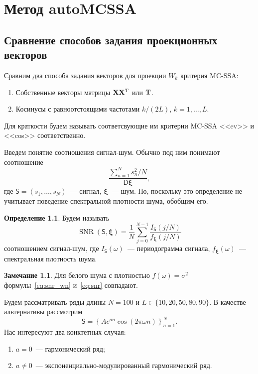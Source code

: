 \documentclass[specialist,
substylefile = spbu_report.rtx,
subf,href,colorlinks=true, 12pt]{disser}
\theoremstyle{definition}
\newtheorem{definition}{Определение}[chapter]
\newtheorem{remark}{Замечание}[chapter]
\begin{document}
\chapter{Метод autoMCSSA}

\section{Сравнение способов задания проекционных векторов}

Сравним два способа задания векторов для проекции $W_k$ критерия MC-SSA:
\begin{enumerate}
	\item Собственные векторы матрицы $\mathbf{X}\mathbf{X}^{\mathrm{T}}$ или $\mathbf{T}$.
	\item Косинусы с равноотстоящими частотами $k/(2L)$, $k=1,\ldots,L$.
\end{enumerate}
Для краткости будем называть соответсвующие им критерии MC-SSA <<ev>> и <<cos>> соответственно.

Введем понятие соотношения сигнал-шум. Обычно под ним понимают соотношение
\begin{equation}
\frac{\sum\limits_{n=1}^N s^2_n/N}{\mathsf{D}{\boldsymbol\xi}},
\end{equation}\label{eq:snr_wn}
где $\mathsf{S}=(s_1,\ldots,s_N)$~--- сигнал, $\boldsymbol{\xi}$~--- шум. Но, поскольку это определение не учитывает поведение спектральной плотности шума, обобщим его. 

\begin{definition}
Будем называть
\begin{equation}\label{eq:snr}
	\operatorname{SNR}(\mathsf{S}, \boldsymbol\xi)=\frac1N\sum_{j=0}^{N-1}\frac{I_{\mathsf{S}}(j/N)}{f_{\boldsymbol{\xi}}(j/N)}
\end{equation}
соотношением сигнал-шум, где $I_{\mathsf{S}}(\omega)$~--- периодограмма сигнала, $f_{\boldsymbol{\xi}}(\omega)$~--- спектральная плотность шума.	
\end{definition}

\begin{remark}
	Для белого шума с плотностью $f(\omega)=\sigma^2$ формулы~\eqref{eq:snr_wn} и~\eqref{eq:snr} совпадают.
\end{remark}

Будем рассматривать ряды длины $N=100$ и $L\in\{10,20,50,80,90\}$. В качестве альтернативы рассмотрим
$$
\mathsf{S}=\left\{Ae^{a n}\cos(2\pi\omega n)\right\}_{n=1}^N.
$$
Нас интересуют два конктетных случая:
\begin{enumerate}
	\item $a=0$~--- гармонический ряд;
	\item $a\ne0$~--- экспоненциально-модулированный гармонический ряд.
\end{enumerate}
\end{document}
